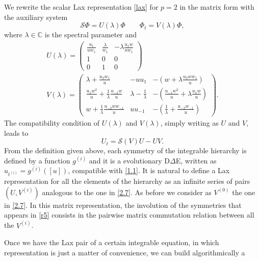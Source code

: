 \documentclass{article}
\numberwithin{equation}{section}
\begin{document}
We rewrite the scalar Lax representation  
\eqref{lax} for $p=2$ in the matrix form with the auxiliary system
	\begin{equation*}
		\mathcal{S} \Phi = U(\lambda) \Phi \qquad \Phi_t = V(\lambda) \Phi,
		\label{newaux}
	\end{equation*}
where $\lambda \in \mathbb{C}$ is the spectral parameter and
	\begin{subequations}
		\begin{gather}
			U(\lambda)=\begin{pmatrix}
				\frac{u_1}{u w_1} & \frac{\lambda}{w_1} & 
-\lambda \frac{u_1 w}{u w_1}\\
				1 & 0 & 0\\
				0 & 1 & 0
			\end{pmatrix} \label{2.71}\\
			V(\lambda)=\begin{pmatrix}
				\lambda +\frac{u_2 w_1}{u} & -u u_1  & 
-\left(w+\lambda\frac{u_2 w w_1}{u}\right)\\
				\frac{u_1 w^2}{u} + 
\frac{1}{\lambda}\frac{u_{-1} w}{u} & \lambda - \frac{1}{\lambda} & 
-\left(\frac{u_{-1} w^2}{u} + \lambda\frac{u_1 w}{u}\right)\\
				w+\frac{1}{\lambda}\frac{u_{-2} w w_{-1}}{u}& u 
u_{-1} & -\left(\frac{1}{\lambda} +\frac{u_{-2} w_{-1}}{u}\right)
			\end{pmatrix}. \label{2.72}
		\end{gather}
		\label{2.7}
	\end{subequations}
The compatibility condition of $U(\lambda)$ and $V(\lambda)$, simply writing as $U$ and $V$, leads to
	\begin{equation*}
		U_t = \mathcal{S}(V)U - U V.
		\label{2.5}
	\end{equation*}
\iffalse
	From the definition given above, each symmetry of the integrable 
hierarchy is defined by a function $g^{(i)}$ and it is a evolutionary 
D$\Delta$E, written as $u_{t^{(i)}} = g^{(i)}([u])$, compatible with 
\eqref{1.1}. It is natural to define a Lax representation for all the elements 
of the hierarchy as an infinite series of pairs $(U, V^{(i)})$ analogous to the 
one in \eqref{2.7}. As before we consider as $V^{(0)}$ the one in \eqref{2.7}. 
In this matrix representation, the involution of the symmetries that appears in 
\eqref{r5} consists in the pairwise matrix commutation relation between all the 
$V^{(i)}$.\par
	Once we have the Lax pair of a certain integrable equation, in which 
representation is just a matter of convenience, we can build algorithmically a  
\end{document}
